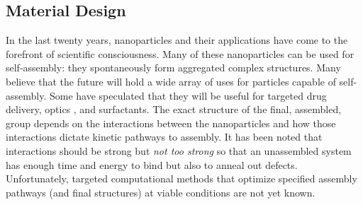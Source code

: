 \documentclass[11pt]{article}
\begin{document}


\subsection*{Material Design}

In the last twenty years, nanoparticles and their applications have come to the forefront of scientific consciousness.
Many of these nanoparticles can be used for self-assembly: they spontaneously form aggregated complex structures.  Many believe that the future will hold a wide array of uses for particles capable of self-assembly.  Some have speculated that they will be useful for targeted drug delivery,
optics ,
and surfactants.
The exact structure of the final, assembled, group depends on the interactions between the nanoparticles and how those interactions dictate kinetic pathways to assembly. It has been noted that interactions should be strong but {\it not too strong} so that an unassembled system has enough time and energy to bind but also to anneal out defects.
Unfortunately, targeted computational methods that optimize specified assembly pathways (and final structures) at viable conditions are not yet known. 
\end{document}
